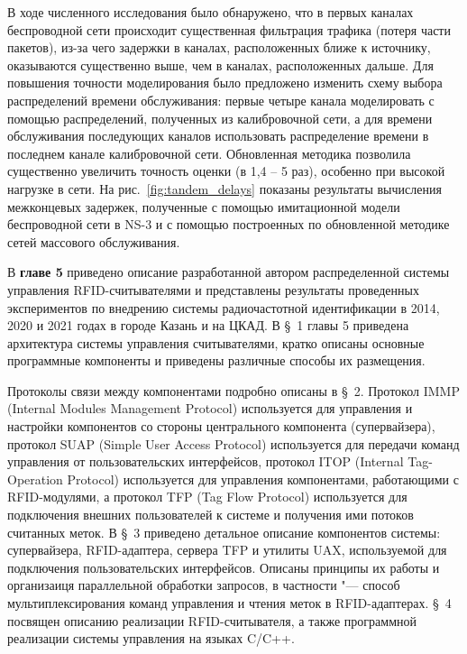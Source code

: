 В ходе численного исследования было обнаружено, что в первых каналах беспроводной сети происходит существенная фильтрация трафика (потеря части пакетов), из-за чего задержки в каналах, расположенных ближе к источнику, оказываются существенно выше, чем в каналах, расположенных дальше. Для повышения точности моделирования было предложено изменить схему выбора распределений времени обслуживания: первые четыре канала моделировать с помощью распределений, полученных из калибровочной сети, а для времени обслуживания последующих каналов использовать распределение времени в последнем канале калибровочной сети. Обновленная методика позволила существенно увеличить точность оценки (в 1,4 -- 5 раз), особенно при высокой нагрузке в сети. На рис.~\ref{fig:tandem_delays} показаны результаты вычисления межконцевых задержек, полученные с помощью имитационной модели беспроводной сети в NS-3 и с помощью построенных по обновленной методике сетей массового обслуживания.



В \textbf{главе 5}
приведено описание разработанной автором распределенной системы управления RFID-считывателями и представлены результаты проведенных экспериментов по внедрению системы радиочастотной идентификации в 2014, 2020 и 2021 годах в городе Казань и на ЦКАД. В \S~1 главы 5 приведена архитектура системы управления считывателями, кратко описаны основные программные компоненты и приведены различные способы их размещения.

Протоколы связи между компонентами подробно описаны в \S~2. Протокол IMMP (Internal Modules Management Protocol) используется для управления и настройки компонентов со стороны центрального компонента (супервайзера), протокол SUAP (Simple User Access Protocol) используется для передачи команд управления от пользовательских интерфейсов, протокол ITOP (Internal Tag-Operation Protocol) используется для управления компонентами, работающими с RFID-модулями, а протокол TFP (Tag Flow Protocol) используется для подключения внешних пользователей к системе и получения ими потоков считанных меток.  В \S~3 приведено детальное описание компонентов системы: супервайзера, RFID-адаптера, сервера TFP и утилиты UAX, используемой для подключения пользовательских интерфейсов. Описаны принципы их работы и организаиця параллельной обработки запросов, в частности "--- способ мультиплексирования команд управления и чтения меток в RFID-адаптерах. \S~4 посвящен описанию реализации RFID-считывателя, а также программной реализации системы управления на языках C/C++.

